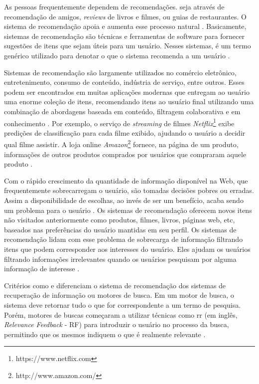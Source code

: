 As pessoas frequentemente dependem de recomendações. seja através de recomendação de amigos, \textit{reviews} de livros e filmes, ou guias de restaurantes. O sistema de recomendação apoia e aumenta esse processo natural \citep{Resnick:1997:RS:245108.245121}. Basicamente, sistemas de recomendação são técnicas e ferramentas de software para fornecer sugestões de itens que sejam úteis para um usuário. Nesses sistemas,  é um termo genérico utilizado para denotar o que o sistema recomenda a um usuário \citep{Ricci:2010:RSH:1941884}.

Sistemas de recomendação são largamente utilizados no comércio eletrônico, entretenimento, consumo de conteúdo, indústria de serviço, entre outros. Esses podem ser encontrados em muitas aplicações modernas que entregam ao usuário uma enorme coleção de itens, recomendando itens ao usuário final utilizando uma combinação de abordagens baseada em conteúdo, filtragem colaborativa e em conhecimento \citep{Ricci:2010:RSH:1941884}. Por exemplo, o serviço de \textit{streaming} de filmes \textit{Netflix}\footnote{https://www.netflix.com} exibe predições de classificação para cada filme exibido, ajudando o usuário a decidir qual filme assistir. A loja online \textit{Amazon}\footnote{http://www.amazon.com/} fornece, na página de um produto, informações de outros produtos comprados por usuários que compraram aquele produto \citep{evaluating-recommender-systems}.

Com o rápido crescimento da quantidade de informação disponível na Web, que frequentemente sobrecarregam o usuário, são tomadas decisões pobres ou erradas. Assim a disponibilidade de escolhas, ao invés de ser um benefício, acaba sendo um problema para o usuário \citep{Ricci:2010:RSH:1941884}. Os sistemas de recomendação oferecem novos itens não visitados anteriormente como produtos, filmes, livros, páginas web, etc, baseados nas preferências do usuário mantidas em seu perfil. Os sistemas de recomendação lidam com esse problema de sobrecarga de informação filtrando itens que podem corresponder aos interesses do usuário. Eles ajudam os usuários filtrando informações irrelevantes quando os usuários pesquisam por alguma informação de interesse \citep{DBLP:journals/corr/abs-1109-0166}.

Critérios como  e  diferenciam o sistema de recomendação dos sistemas de recuperação de informação ou motores de busca. Em um motor de busca, o sistema deve retornar tudo o que for correspondente a um termo de pesquisa. Porém, motores de buscas começaram a utilizar técnicas como \ac{rr} (em inglês, \textit{Relevance Feedback} - RF) para introduzir o usuário no processo da busca, permitindo que os mesmos indiquem o que é realmente relevante \citep{Burke2002}.

